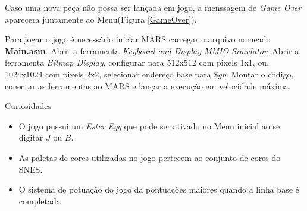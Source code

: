 \documentclass{article}
\begin{document}
Caso uma nova peça não possa ser lançada em jogo, a menssagem de \textit{Game Over} aparecera juntamente ao Menu(Figura \ref{GameOver}).

Para jogar o jogo é necessário iniciar MARS carregar o arquivo nomeado \textbf{Main.asm}. Abrir a ferramenta \textit{Keyboard and Display MMIO Simulator}. Abrir a ferramenta \textit{Bitmap Display}, configurar para 512x512 com pixels 1x1, ou, 1024x1024 com pixels 2x2, selecionar endereço base para $\$gp$. Montar o código, conectar as ferramentas ao MARS e lançar a execução em velocidade máxima.

Curiosidades
\begin{itemize}
  \item O jogo pussui um \textit{Ester Egg} que pode ser ativado no Menu inicial ao se digitar $J$ ou $B$.
  \item As paletas de cores utilizadas no jogo pertecem ao conjunto de cores do SNES.
  \item O sistema de potuação do jogo da pontuações maiores quando a linha base é completada
\end{itemize}
\end{document}

